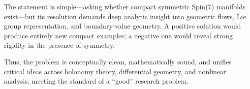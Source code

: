The statement is simple—asking whether compact symmetric Spin(7) manifolds exist—but its resolution demands deep analytic insight into geometric flows, Lie group representation, and boundary-value geometry. A positive solution would produce entirely new compact examples; a negative one would reveal strong rigidity in the presence of symmetry.  

Thus, the problem is conceptually clean, mathematically sound, and unifies critical ideas across holonomy theory, differential geometry, and nonlinear analysis, meeting the standard of a “good” research problem.